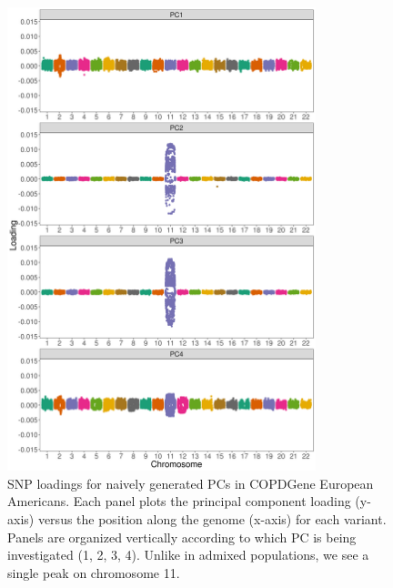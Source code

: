 \documentclass[12pt]{article}
\begin{document}
\begin{figure}[h]
\center
\includegraphics[width=0.8\textwidth]{figs/COPD/EUR_prune_FALSE_1_0_0.01_snprelate_load_1}
\caption{SNP loadings for naively generated PCs in COPDGene European Americans. Each panel plots the principal component loading (y-axis) versus the position along the genome (x-axis) for each variant. Panels are organized vertically according to which PC is being investigated (1, 2, 3, 4). Unlike in admixed populations, we see a single peak on chromosome 11.}
\label{fig:corr-Eur}
\end{figure}
\end{document}
